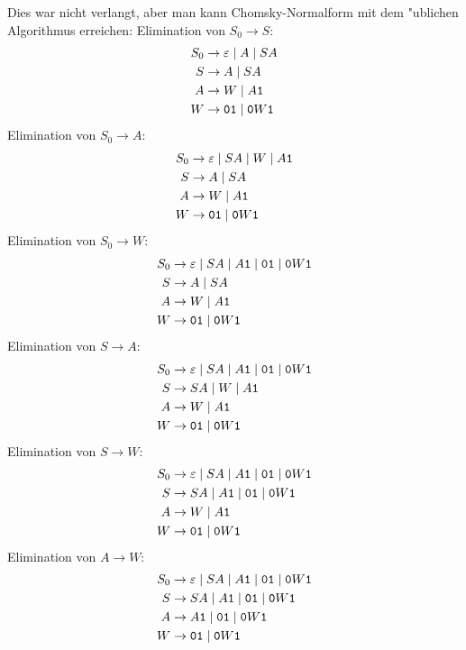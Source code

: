 \begin{loesung}
Dies war nicht verlangt, aber man kann Chomsky-Normalform mit dem
"ublichen Algorithmus erreichen: Elimination von $S_0\to S$:
\begin{align*}
S_0&\to \varepsilon\;|\;A\;|\;SA\\
S  &\to A\;|\;SA\\
A  &\to W\;|\;A{\tt 1}\\
W  &\to {\tt 01}\;|\; {\tt 0}W{\tt 1}
\end{align*}
Elimination von $S_0\to A$:
\begin{align*}
S_0&\to \varepsilon\;|\;SA\;|\;W\;|\;A{\tt 1}\\
S  &\to A\;|\;SA\\
A  &\to W\;|\;A{\tt 1}\\
W  &\to {\tt 01}\;|\; {\tt 0}W{\tt 1}
\end{align*}
Elimination von $S_0\to W$:
\begin{align*}
S_0&\to \varepsilon\;|\;SA\;|\;A{\tt 1}\;|\;{\tt 01}\;|\;{\tt 0}W{\tt 1}\\
S  &\to A\;|\;SA\\
A  &\to W\;|\;A{\tt 1}\\
W  &\to {\tt 01}\;|\; {\tt 0}W{\tt 1}
\end{align*}
Elimination von $S\to A$:
\begin{align*}
S_0&\to \varepsilon\;|\;SA\;|\;A{\tt 1}\;|\;{\tt 01}\;|\;{\tt 0}W{\tt 1}\\
S  &\to SA\;|\;W\;|\;A{\tt 1}\\
A  &\to W\;|\;A{\tt 1}\\
W  &\to {\tt 01}\;|\; {\tt 0}W{\tt 1}
\end{align*}
Elimination von $S\to W$:
\begin{align*}
S_0&\to \varepsilon\;|\;SA\;|\;A{\tt 1}\;|\;{\tt 01}\;|\;{\tt 0}W{\tt 1}\\
S  &\to SA\;|\;A{\tt 1}\;|\;{\tt 01}\;|\;{\tt 0}W{\tt 1}\\
A  &\to W\;|\;A{\tt 1}\\
W  &\to {\tt 01}\;|\; {\tt 0}W{\tt 1}
\end{align*}
Elimination von $A\to W$:
\begin{align*}
S_0&\to \varepsilon\;|\;SA\;|\;A{\tt 1}\;|\;{\tt 01}\;|\;{\tt 0}W{\tt 1}\\
S  &\to SA\;|\;A{\tt 1}\;|\;{\tt 01}\;|\;{\tt 0}W{\tt 1}\\
A  &\to A{\tt 1}\;|\;{\tt 01}\;|\;{\tt 0}W{\tt 1}\\
W  &\to {\tt 01}\;|\; {\tt 0}W{\tt 1}
\end{align*}

\end{loesung}
